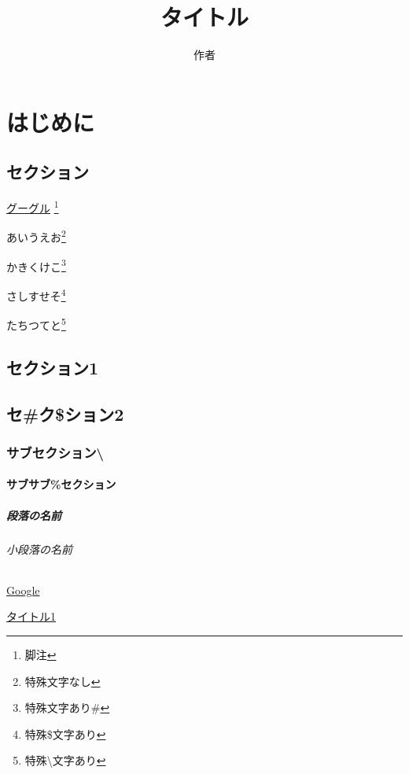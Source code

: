 \documentclass[uplatex, oneside]{jsbook}
\title{タイトル}
\author{作者}
\begin{document}
\maketitle
\tableofcontents

\chapter{はじめに}

\section{セクション}

\href{http://www.google.co.jp}{グーグル}
\footnote{脚注}

\newpage

あいうえお\footnote{特殊文字なし}

かきくけこ\footnote{特殊文字あり\#}

さしすせそ\footnote{特殊\$文字あり}

たちつてと\footnote{特殊\textbackslash 文字あり}

\newpage

\section{セクション1}

\section{セ\#ク\$ション2}

\subsection{サブセクション\textbackslash}

\subsubsection{サブサブ\%セクション}

\paragraph{段落の名前}

\subparagraph{小段落の名前}

\newpage

\href{http://www.google.co.jp}{Google}

\href{http://localhost:3000/sample/page1}{タイトル1}
\end{document}
